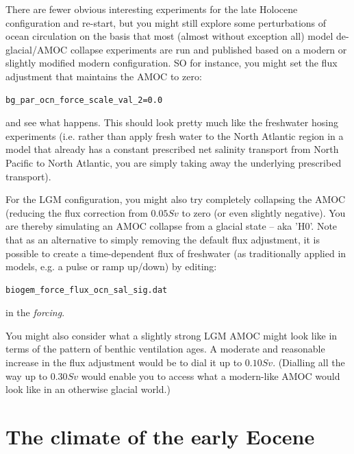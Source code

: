\noindent There are fewer obvious interesting experiments for the late Holocene configuration and re-start, but you might still explore some perturbations of ocean circulation on the basis that most (almost without exception all) model de-glacial/AMOC collapse experiments are run and published based on a modern or slightly modified modern configuration. SO for instance, you might set the flux adjustment that maintains the AMOC to zero:
\vspace{-2mm}\begin{verbatim}
bg_par_ocn_force_scale_val_2=0.0
\end{verbatim}\vspace{-2mm}
and see what happens. This should look pretty much like the freshwater hosing experiments (i.e. rather than apply fresh water to the North Atlantic region in a model that already has a constant prescribed net salinity transport from North Pacific to North Atlantic, you are simply taking away the underlying prescribed transport).

\vspace{1mm}
For the LGM configuration, you might also try completely collapsing the AMOC (reducing the flux correction from \(0.05 Sv\) to zero (or even slightly negative). You are thereby simulating an AMOC collapse from a glacial state -- aka 'H0'. Note that as an alternative to simply removing the default flux adjustment, it is possible to create a time-dependent flux of freshwater (as traditionally applied in models, e.g. a pulse or ramp up/down) by editing:
\vspace{-2mm}\begin{verbatim}
biogem_force_flux_ocn_sal_sig.dat
\end{verbatim}\vspace{-2mm}
in the \textit{forcing}.

\vspace{1mm}
You might also consider what a slightly strong LGM AMOC might look like in terms of the pattern of benthic ventilation ages. A moderate and reasonable increase in the flux adjustment would be to dial it up to \(0.10 Sv\). (Dialling all the way up to \(0.30 Sv\) would enable you to access what a modern-like AMOC would look like in an otherwise glacial world.)

\newpage

\section{The climate of the early Eocene}

